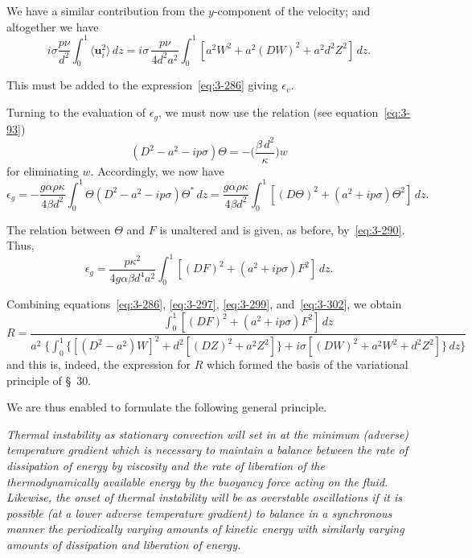 We have a similar contribution from the $y$-component of the velocity; and altogether we have
\begin{equation}\label{eq:3-299}
i\sigma\frac{p\nu}{d^2}\int_0^1 \langle\mathbf{u}_i^2\rangle\,dz = i\sigma\,\frac{p\nu}{4d^2 a^2}\int_0^1 [a^2 W^2 + a^2(DW)^2 + a^2 d^2 Z^2]\,dz.
\end{equation}

This must be added to the expression~\eqref{eq:3-286} giving $\epsilon_v$.

Turning to the evaluation of $\epsilon_g$, we must now use the relation (see equation~\eqref{eq:3-93})
\begin{equation}\label{eq:3-300}
(D^2 - a^2 - ip\sigma)\Theta = -\bigg(\frac{\beta\,d^2}{\kappa}\bigg)w
\end{equation}
for eliminating $w$. Accordingly, we now have
\begin{equation}\label{eq:3-301}
\epsilon_g = -\frac{g\alpha\rho\kappa}{4\beta d^2}\int_0^1 \Theta(D^2 - a^2 - ip\sigma)\Theta^*\,dz = \frac{g\alpha\rho\kappa}{4\beta d^2}\int_0^1 [(D\Theta)^2 + (a^2 + ip\sigma)\Theta^2]\,dz.
\end{equation}

The relation between $\Theta$ and $F$ is unaltered and is given, as before, by~\eqref{eq:3-290}. Thus,
\begin{equation}\label{eq:3-302}
\epsilon_g = \frac{p\kappa^2}{4g\alpha\beta d^4 a^2}\int_0^1 [(DF)^2 + (a^2 + ip\sigma)F^2]\,dz.
\end{equation}

Combining equations~\eqref{eq:3-286}, \eqref{eq:3-297}, \eqref{eq:3-299}, and~\eqref{eq:3-302}, we obtain
\begin{equation}\label{eq:3-303}
R = \frac{\displaystyle\int_0^1 [(DF)^2 + (a^2 + ip\sigma)F^2]\,dz}{a^2\;\displaystyle\bigg\{\int_0^1\{[(D^2 - a^2)W]^2 + d^2[(DZ)^2 + a^2 Z^2]\} + i\sigma[(DW)^2 + a^2 W^2 + d^2 Z^2]\}\,dz\bigg\}}
\end{equation}
and this is, indeed, the expression for $R$ which formed the basis of the variational principle of \S~30.

We are thus enabled to formulate the following general principle.

\emph{Thermal instability as stationary convection will set in at the minimum (adverse) temperature gradient which is necessary to maintain a balance between the rate of dissipation of energy by viscosity and the rate of liberation of the thermodynamically available energy by the buoyancy force acting on the fluid. Likewise, the onset of thermal instability will be as overstable oscillations if it is possible (at a lower adverse temperature gradient) to balance in a synchronous manner the periodically varying amounts of kinetic energy with similarly varying amounts of dissipation and liberation of energy.}

